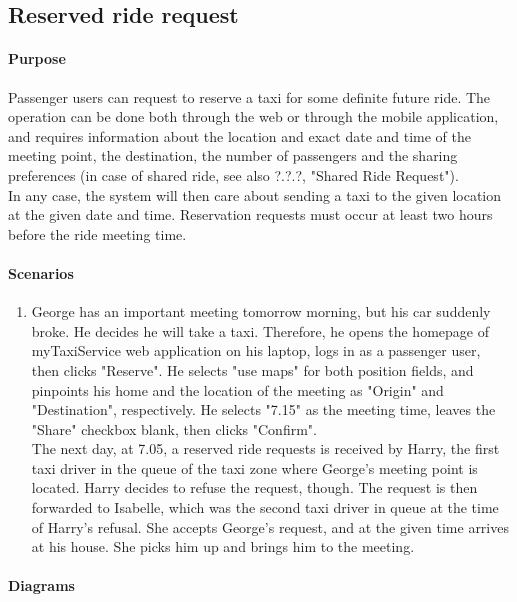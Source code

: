 \subsection{Reserved ride request}

\paragraph{Purpose}
Passenger users can request to reserve a taxi for some definite future ride. The operation can be done both through the web or through the mobile application, and requires information about the location and exact date and time of the meeting point, the destination, the number of passengers and the sharing preferences (in case of shared ride, see also ?.?.?, "Shared Ride Request").\\
In any case, the system will then care about sending a taxi to the given location at the given date and time. Reservation requests must occur at least two hours before the ride meeting time.

\paragraph{Scenarios}
\begin{enumerate}
	\item George has an important meeting tomorrow morning, but his car suddenly broke. He decides he will take a taxi. Therefore, he opens the homepage of myTaxiService web application on his laptop, logs in as a passenger user, then clicks "Reserve". He selects "use maps" for both position fields, and pinpoints his home and the location of the meeting as "Origin" and "Destination", respectively. He selects "7.15" as the meeting time, leaves the "Share" checkbox blank, then clicks "Confirm".\\
	The next day, at 7.05, a reserved ride requests is received by Harry, the first taxi driver in the queue of the taxi zone where George's meeting point is located. Harry decides to refuse the request, though. The request is then forwarded to Isabelle, which was the second taxi driver in queue at the time of Harry's refusal. She accepts George's request, and at the given time arrives at his house. She picks him up and brings him to the meeting.
\end{enumerate}

\paragraph{Diagrams}

